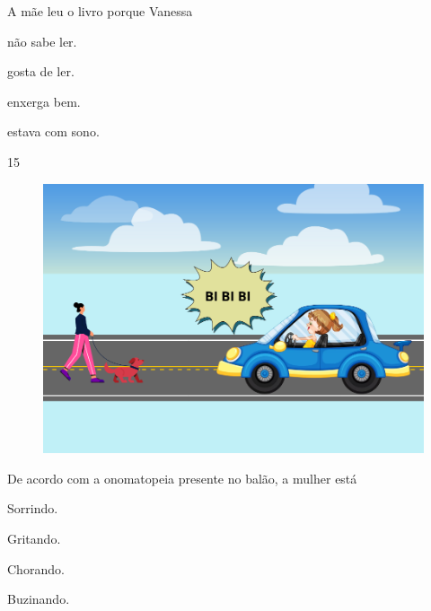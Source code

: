
A mãe leu o livro porque Vanessa

\begin{escolha}
\item não sabe ler.

\item gosta de ler.

\item enxerga bem.

\item estava com sono.
\end{escolha}


\num{15}

\begin{figure}[htpb!]
\centering
\includegraphics[width=.5\textwidth]{media/image182.png}
\end{figure}


De acordo com a onomatopeia presente no balão, a mulher está

\begin{escolha}
\item Sorrindo.

\item Gritando.

\item Chorando.

\item Buzinando.
\end{escolha}




